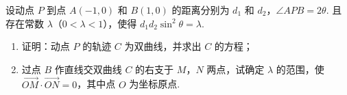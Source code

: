\begin{problem}
设动点 \(P\) 到点 \(A(-1, 0)\) 和 \(B(1, 0)\) 的距离分别为 \(d_{1}\) 和 \(d_{2}\)，\(\angle APB = 2\theta\). 且存在常数 \(\lambda\)（\(0 < \lambda < 1\)），使得 \(d_{1}d_{2}\sin^{2}\theta = \lambda\).

\begin{enumerate}
\item 证明：动点 \(P\) 的轨迹 \(C\) 为双曲线，并求出 \(C\) 的方程；
\item 过点 \(B\) 作直线交双曲线 \(C\) 的右支于 \(M\)，\(N\) 两点，试确定 \(\lambda\) 的范围，使 \(\overrightarrow{OM}\cdot\overrightarrow{ON}=0\)，其中点 \(O\) 为坐标原点.
\end{enumerate}

\end{problem}

